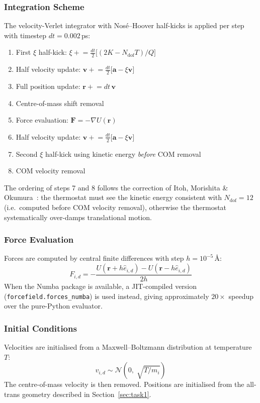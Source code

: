 \documentclass[12pt,a4paper]{article}
\begin{document}
\subsubsection{Integration Scheme}
The velocity-Verlet integrator with Nos\'{e}--Hoover half-kicks is applied
per step with timestep $dt = 0.002$\,ps:
\begin{enumerate}
  \item First $\xi$ half-kick: $\xi \mathrel{+}= \tfrac{dt}{2}\bigl[(2K - N_{\mathrm{dof}}T)/Q\bigr]$
  \item Half velocity update: $\mathbf{v} \mathrel{+}= \tfrac{dt}{2}\bigl[\mathbf{a} - \xi\mathbf{v}\bigr]$
  \item Full position update: $\mathbf{r} \mathrel{+}= dt\,\mathbf{v}$
  \item Centre-of-mass shift removal
  \item Force evaluation: $\mathbf{F} = -\nabla U(\mathbf{r})$
  \item Half velocity update: $\mathbf{v} \mathrel{+}= \tfrac{dt}{2}\bigl[\mathbf{a} - \xi\mathbf{v}\bigr]$
  \item Second $\xi$ half-kick using kinetic energy \emph{before} COM removal
  \item COM velocity removal
\end{enumerate}
The ordering of steps 7 and 8 follows the correction of Itoh, Morishita \&
Okumura~\citeyear{Itoh2013}: the thermostat must see the kinetic energy
consistent with $N_{\mathrm{dof}} = 12$ (i.e.\ computed before COM velocity
removal), otherwise the thermostat systematically over-damps translational
motion.

\subsubsection{Force Evaluation}
Forces are computed by central finite differences with step $h = 10^{-5}$\,\AA:
\begin{equation}
  F_{i,d} = -\frac{U(\mathbf{r} + h\hat{e}_{i,d})
                  - U(\mathbf{r} - h\hat{e}_{i,d})}{2h}
  \label{eq:fd}
\end{equation}
When the Numba package is available, a JIT-compiled version
(\texttt{forcefield.forces\_numba}) is used instead, giving approximately
$20\times$ speedup over the pure-Python evaluator.

\subsubsection{Initial Conditions}
Velocities are initialised from a Maxwell--Boltzmann distribution at
temperature $T$:
\begin{equation}
  v_{i,d} \sim \mathcal{N}\!\left(0,\; \sqrt{T/m_i}\right)
  \label{eq:mb}
\end{equation}
The centre-of-mass velocity is then removed.  Positions are initialised
from the all-trans geometry described in Section~\ref{sec:task1}.
\end{document}
